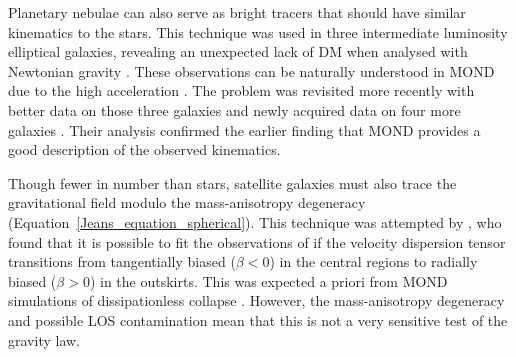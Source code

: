\documentclass[fleqn,usenatbib,useAMS]{mnras} %
\begin{document}
Planetary nebulae can also serve as bright tracers that should have similar kinematics to the stars. This technique was used in three intermediate luminosity elliptical galaxies, revealing an unexpected lack of DM when analysed with Newtonian gravity \citep{Romanowsky_2003}. These observations can be naturally understood in MOND due to the high acceleration \citep{Milgrom_2003}. The problem was revisited more recently with better data on those three galaxies and newly acquired data on four more galaxies \citep{Tian_2016}. Their analysis confirmed the earlier finding that MOND provides a good description of the observed kinematics.

Though fewer in number than stars, satellite galaxies must also trace the gravitational field modulo the mass-anisotropy degeneracy (Equation~\ref{Jeans_equation_spherical}). This technique was attempted by \citet{Angus_2008}, who found that it is possible to fit the observations of \citet{Klypin_2009_SDSS} if the velocity dispersion tensor transitions from tangentially biased ($\beta < 0$) in the central regions to radially biased ($\beta > 0$) in the outskirts. This was expected a priori from MOND simulations of dissipationless collapse \citep{Nipoti_2007_collapse}. However, the mass-anisotropy degeneracy and possible LOS contamination mean that this is not a very sensitive test of the gravity law.
\end{document}

